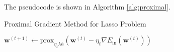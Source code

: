 The pseudocode is shown in Algorithm \ref{alg:proximal}.

\begin{algorithm}
\caption{Proximal Gradient Method for Lasso Problem}
\begin{algorithmic}[1]
        \State $\mathbf{w}^{(t+1)} \gets \text{prox}_{\eta_t \lambda h}(\mathbf{w}^{(t)}-\eta_t\nabla E_{\text{in}}(\mathbf{w}^{(t)}))$
    \EndFor
\end{algorithmic}
\label{alg:proximal}
\end{algorithm}

\newpage